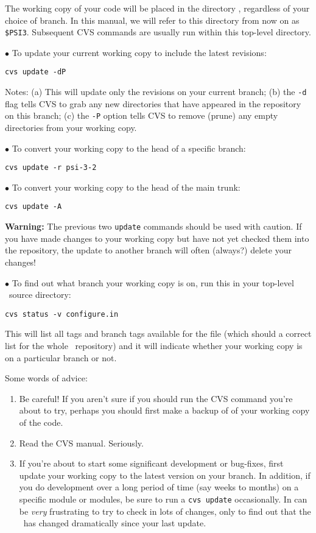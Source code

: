 \noindent The working copy of your code will be placed in the directory
, regardless of your choice of branch.  In this manual, we will
refer to this directory from now on as {\tt \$PSI3}.  Subsequent CVS
commands are usually run within this top-level directory.

\noindent
$\bullet$ To update your current working copy to include the latest revisions:

{\tt cvs update -dP}

\noindent
Notes: (a) This will update only the revisions on your current branch;
(b) the {\tt -d} flag tells CVS to grab any new directories that have
appeared in the repository on this branch; (c) the {\tt -P} option tells
CVS to remove (prune) any empty directories from your working copy.

\noindent
$\bullet$ To convert your working copy to the head of a specific branch:

{\tt cvs update -r psi-3-2}

\noindent
$\bullet$ To convert your working copy to the head of the main trunk:

{\tt cvs update -A}

\noindent
{\bf Warning:} The previous two {\tt update} commands should be used {\sc
with caution}.  If you have made changes to your working copy but have
not yet checked them into the repository, the update to another branch
will often (always?) delete your changes!

\noindent
$\bullet$ To find out what branch your working copy is on, run this in your
top-level \PSIthree\ source directory:

{\tt cvs status -v configure.in}

\noindent
This will list all tags and branch tags available for the file (which
should a correct list for the whole \PSIthree\ repository) and it will
indicate whether your working copy is on a particular branch or not.

\noindent
Some words of advice:
\begin{enumerate}
\item Be careful!  If you aren't sure if you should run the CVS command
you're about to try, perhaps you should first make a backup of of your
working copy of the code.
\item Read the CVS manual.  Seriously.
\begin{center}
\end{center}
\item If you're about to start some significant development or bug-fixes,
first update your working copy to the latest version on your branch.
In addition, if you do development over a long period of time (say weeks to
months) on a specific module or modules, be sure to run a {\tt cvs update}
occasionally. In can be {\em very} frustrating to try to check in lots
of changes, only to find out that the \PSIthree\ has changed dramatically
since your last update.
\end{enumerate}

